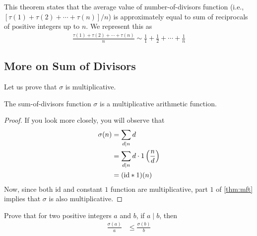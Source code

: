 \begin{note}
	This theorem states that the average value of number-of-divisors function (i.e., $[\tau(1) +‌\tau(2) + \cdots + \tau(n)]/n$) is approximately equal to sum of reciprocals of positive integers up to $n$. We represent this as
		\begin{align*}
			\frac{\tau(1) + \tau(2) + \cdots + \tau(n)}{n} \sim \frac{1}{1} + \frac{1}{2} + \cdots + \frac{1}{n}
		\end{align*}
\end{note}
\subsection{More on Sum of Divisors}
Let us prove that $\sigma$ is multiplicative.
\begin{proposition}\label{prop:multiplicative-sigma}
	The sum-of-divisors function $\sigma$ is a multiplicative arithmetic function.
\end{proposition}

\begin{proof}
	If you look more closely, you will observe that
		\begin{align*}
			\sigma(n) & = \sum_{d\mid n} d\\
			  & = \sum_{d\mid n} d \cdot 1\left(\frac{n}{d}\right)\\
			  & = (\text{id} \ast 1)(n)
		\end{align*}
	Now, since both $\text{id}$ and constant $1$ function are multiplicative, part $1$ of \autoref{thm:mft} implies that $\sigma$ is also multiplicative.
\end{proof}

\begin{problem} %
	Prove that for two positive integers $a$ and $b$, if $a\mid b$, then
		\begin{align*}
			\frac{\sigma(a)}{a}
				& \leq \frac{\sigma(b)}{b}
		\end{align*}
\end{problem}

